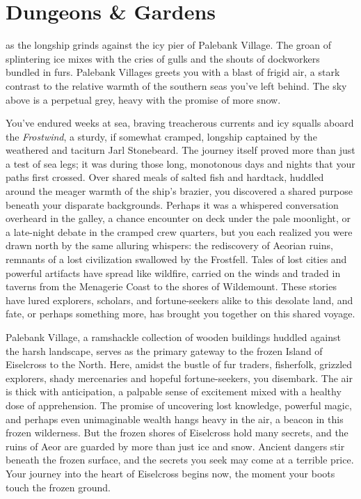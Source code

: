 \documentclass[
  12pt,twoside,twocolumn,openany,nodeprecatedcode]{dndbook}
\author{}
\date{}
\begin{document}
\chapter{Dungeons \& Gardens}\label{dungeons-gardens}

 as the longship
grinds against the icy pier of Palebank Village. The groan of
splintering ice mixes with the cries of gulls and the shouts of
dockworkers bundled in furs. Palebank Villages greets you with a blast
of frigid air, a stark contrast to the relative warmth of the southern
seas you've left behind. The sky above is a perpetual grey, heavy with
the promise of more snow.

You've endured weeks at sea, braving treacherous currents and icy
squalls aboard the \emph{Frostwind}, a sturdy, if somewhat cramped,
longship captained by the weathered and taciturn Jarl Stonebeard. The
journey itself proved more than just a test of sea legs; it was during
those long, monotonous days and nights that your paths first crossed.
Over shared meals of salted fish and hardtack, huddled around the meager
warmth of the ship's brazier, you discovered a shared purpose beneath
your disparate backgrounds. Perhaps it was a whispered conversation
overheard in the galley, a chance encounter on deck under the pale
moonlight, or a late-night debate in the cramped crew quarters, but you
each realized you were drawn north by the same alluring whispers: the
rediscovery of Aeorian ruins, remnants of a lost civilization swallowed
by the Frostfell. Tales of lost cities and powerful artifacts have
spread like wildfire, carried on the winds and traded in taverns from
the Menagerie Coast to the shores of Wildemount. These stories have
lured explorers, scholars, and fortune-seekers alike to this desolate
land, and fate, or perhaps something more, has brought you together on
this shared voyage.

Palebank Village, a ramshackle collection of wooden buildings huddled
against the harsh landscape, serves as the primary gateway to the frozen
Island of Eiselcross to the North. Here, amidst the bustle of fur
traders, fisherfolk, grizzled explorers, shady mercenaries and hopeful
fortune-seekers, you disembark. The air is thick with anticipation, a
palpable sense of excitement mixed with a healthy dose of apprehension.
The promise of uncovering lost knowledge, powerful magic, and perhaps
even unimaginable wealth hangs heavy in the air, a beacon in this frozen
wilderness. But the frozen shores of Eiselcross hold many secrets, and
the ruins of Aeor are guarded by more than just ice and snow. Ancient
dangers stir beneath the frozen surface, and the secrets you seek may
come at a terrible price. Your journey into the heart of Eiselcross
begins now, the moment your boots touch the frozen ground.
\end{document}
